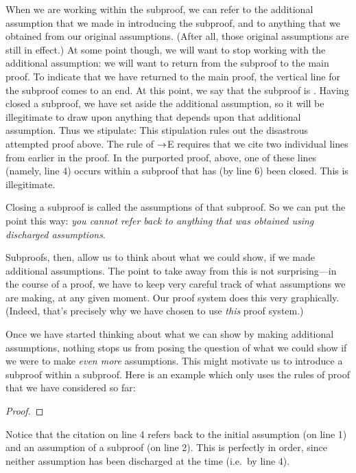 When we are working within the subproof, we can refer to the additional assumption that we made in introducing the subproof, and to anything that we obtained from our original assumptions. (After all, those original assumptions are still in effect.) At some point though, we will want to stop working with the additional assumption: we will want to return from the subproof to the main proof. To indicate that we have returned to the main proof, the vertical line for the subproof comes to an end. At this point, we say that the subproof is . Having closed a subproof, we have set aside the additional assumption, so it will be illegitimate to draw upon anything that depends upon that additional assumption. Thus we stipulate:
This stipulation rules out the disastrous attempted proof above. The rule of $\rightarrow$E requires that we cite two individual lines from earlier in the proof. In the purported proof, above, one of these lines (namely, line 4) occurs within a subproof that has (by line 6) been closed. This is illegitimate. 

Closing a subproof is called  the assumptions of that subproof. So we can put the point this way: \emph{you cannot refer back to anything that was obtained using discharged assumptions}. 

Subproofs, then, allow us to think about what we could show, if we made additional assumptions. The point to take away from this is not surprising---in the course of a proof, we have to keep very careful track of what assumptions we are making, at any given moment. Our proof system does this very graphically. (Indeed, that's precisely why we have chosen to use \emph{this} proof system.)

Once we have started thinking about what we can show by making additional assumptions, nothing stops us from posing the question of what we could show if we were to make \emph{even more} assumptions. This might motivate us to introduce a subproof within a subproof. Here is an example which only uses the rules of proof that we have considered so far:
\begin{proof}
\open
	\open
	\close
\close
{}
\end{proof}
Notice that the citation on line 4 refers back to the initial assumption (on line 1) and an assumption of a subproof (on line 2). This is perfectly in order, since neither assumption has been discharged at the time (i.e.\ by line 4).

